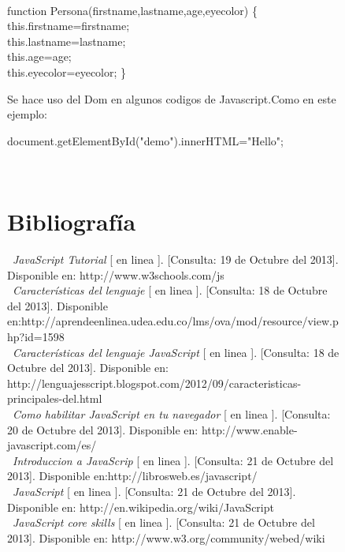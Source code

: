 \documentclass[11pt]{article} %
\begin{document}
\begin{figure}
\ \begin{tt}
function Persona(firstname,lastname,age,eyecolor)  
\{ \\
this.firstname=firstname; \\
this.lastname=lastname; \\
this.age=age; \\
this.eyecolor=eyecolor;
\}
\\
\end{tt}


Se hace uso del Dom en algunos codigos de Javascript.Como en este ejemplo: \\
 \begin{tt} document.getElementById("demo").innerHTML="Hello"; \end{tt}


\
\\
\end{figure}
\begin{figure}


\section{Bibliografía}


\   \emph{JavaScript Tutorial} [ en linea ]. [Consulta: 19 de Octubre del 2013]. Disponible en: {http://www.w3schools.com/js } \\

\   \emph{Características del lenguaje} [ en linea ]. [Consulta: 18 de Octubre del 2013]. Disponible en:{http://aprendeenlinea.udea.edu.co/lms/ova/mod/resource/view.php?id=1598 } \\

\   \emph{Características del lenguaje JavaScript} [ en linea ]. [Consulta: 18 de Octubre del 2013]. Disponible en: {http://lenguajesscript.blogspot.com/2012/09/caracteristicas-principales-del.html } \\

\  \emph{Como habilitar JavaScript en tu navegador} [ en linea ]. [Consulta: 20 de Octubre del 2013]. Disponible en: {http://www.enable-javascript.com/es/} \\

\   \emph{Introduccion a JavaScrip} [ en linea ]. [Consulta: 21 de Octubre del 2013]. Disponible en:{http://librosweb.es/javascript/} \\


\  \emph{JavaScript} [ en linea ]. [Consulta: 21 de Octubre del 2013]. Disponible en: { http://en.wikipedia.org/wiki/JavaScript}  \\

\  \emph{JavaScript core skills} [ en linea ]. [Consulta: 21 de Octubre del 2013]. Disponible en: { http://www.w3.org/community/webed/wiki} \\


\end{figure}
\end{document}
